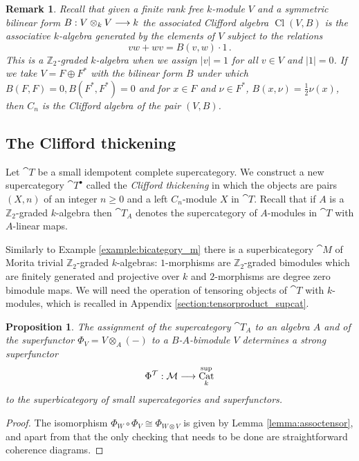 \documentclass[english,letter paper,12pt,leqno]{article}
\newtheorem{proposition}[theorem]{Proposition}
\theoremstyle{example}
\newtheorem{remark}[theorem]{Remark}
\numberwithin{equation}{section}
\DeclareMathOperator{\Cat}{Cat}
\begin{document}
\begin{remark} Recall that given a finite rank free $k$-module $V$ and a symmetric bilinear form $B: V \otimes_k V \longrightarrow k$ the associated Clifford algebra $\operatorname{Cl}(V, B)$ is the associative $k$-algebra generated by the elements of $V$ subject to the relations
\[
vw + wv = B(v,w) \cdot 1\,.
\]
This is a $\mathbb{Z}_2$-graded $k$-algebra when we assign $|v| = 1$ for all $v \in V$ and $|1| = 0$. If we take $V = F \oplus F^*$ with the bilinear form $B$ under which $B(F,F) = 0, B(F^*, F^*) = 0$ and for $x \in F$ and $\nu \in F^*$, $B(x, \nu) = \frac{1}{2} \nu(x)$, then $C_n$ is the Clifford algebra of the pair $(V,B)$.
\end{remark}

\subsection{The Clifford thickening}\label{section:cliff_thick}

Let $\cat{T}$ be a small idempotent complete supercategory. We construct a new supercategory $\cat{T}^\bullet$ called the \emph{Clifford thickening} in which the objects are pairs $(X,n)$ of an integer $n \ge 0$ and a left $C_n$-module $X$ in $\cat{T}$. Recall that if $A$ is a $\mathbb{Z}_2$-graded $k$-algebra then $\cat{T}_A$ denotes the supercategory of $A$-modules in $\cat{T}$ with $A$-linear maps.


Similarly to Example \ref{example:bicategory_m} there is a superbicategory $\cat{M}$ of Morita trivial $\mathbb{Z}_2$-graded $k$-algebras: $1$-morphisms are $\mathbb{Z}_2$-graded bimodules which are finitely generated and projective over $k$ and $2$-morphisms are degree zero bimodule maps. We will need the operation of tensoring objects of $\cat{T}$ with $k$-modules, which is recalled in Appendix \ref{section:tensorproduct_supcat}. 

\begin{proposition} The assignment of the supercategory $\cat{T}_A$ to an algebra $A$ and of the superfunctor $\Phi_V = V \otimes_A (-)$ to a $B$-$A$-bimodule $V$ determines a strong superfunctor
\[
\Phi^{\cat{T}}: \cat{M} \lto \Cat^{\operatorname{sup}}_k
\]
to the superbicategory of small supercategories and superfunctors.
\end{proposition}
\begin{proof}
The isomorphism $\Phi_W \circ \Phi_V \cong \Phi_{W \otimes V}$ is given by Lemma \ref{lemma:assoctensor}, and apart from that the only checking that needs to be done are straightforward coherence diagrams.
\end{proof}
\end{document}
